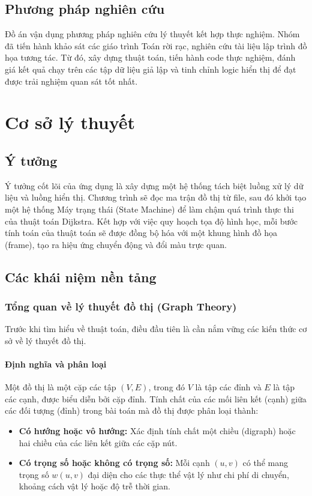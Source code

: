 \documentclass[12pt,a4paper,oneside]{report}
\begin{document}
\section{Phương pháp nghiên cứu}
Đồ án vận dụng phương pháp nghiên cứu lý thuyết kết hợp thực nghiệm. Nhóm đã tiến hành khảo sát các giáo trình Toán rời rạc, nghiên cứu tài liệu lập trình đồ họa tương tác. Từ đó, xây dựng thuật toán, tiến hành code thực nghiệm, đánh giá kết quả chạy trên các tập dữ liệu giả lập và tinh chỉnh logic hiển thị để đạt được trải nghiệm quan sát tốt nhất.

\chapter{Cơ sở lý thuyết}

\section{Ý tưởng}
Ý tưởng cốt lõi của ứng dụng là xây dựng một hệ thống tách biệt luồng xử lý dữ liệu và luồng hiển thị. Chương trình sẽ đọc ma trận đồ thị từ file, sau đó khởi tạo một hệ thống Máy trạng thái (State Machine) để làm chậm quá trình thực thi của thuật toán Dijkstra. Kết hợp với việc quy hoạch tọa độ hình học, mỗi bước tính toán của thuật toán sẽ được đồng bộ hóa với một khung hình đồ họa (frame), tạo ra hiệu ứng chuyển động và đổi màu trực quan.

\section{Các khái niệm nền tảng}

\subsection{Tổng quan về lý thuyết đồ thị (Graph Theory)}
Trước khi tìm hiểu về thuật toán, điều đầu tiên là cần nắm vững các kiến thức cơ sở về lý thuyết đồ thị.
\subsubsection{Định nghĩa và phân loại}
Một đồ thị là một cặp các tập $(V, E)$, trong đó $V$ là tập các đỉnh và $E$ là tập các cạnh, được biểu diễn bởi cặp đỉnh. Tính chất của các mối liên kết (cạnh) giữa các đối tượng (đỉnh) trong bài toán mà đồ thị được phân loại thành: 
\begin{itemize}
    \item \textbf{Có hướng hoặc vô hướng:} Xác định tính chất một chiều (digraph) hoặc hai chiều
của các liên kết giữa các cặp nút.
    \item \textbf{Có trọng số hoặc không có trọng số:} Mỗi cạnh $(u, v)$ có thể mang trọng số $w(u, v)$ đại diện cho các thực thể vật lý như chi phí di chuyển, khoảng cách vật lý hoặc độ trễ thời gian. 
\end{itemize}
\end{document}
